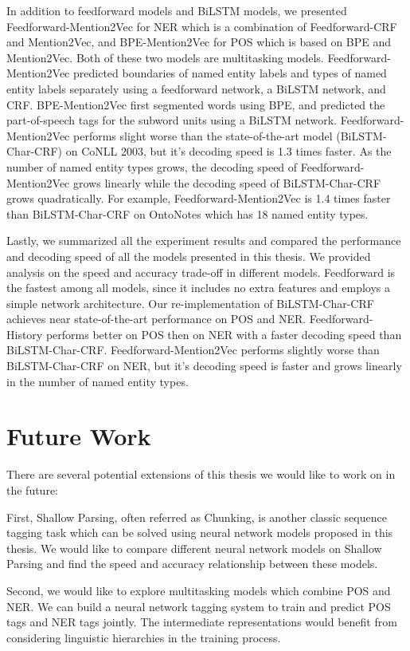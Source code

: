 \documentclass{sfuthesis}
\begin{document}
In addition to feedforward models and BiLSTM models, we presented Feedforward-Mention2Vec for NER which is a combination of Feedforward-CRF and Mention2Vec, and BPE-Mention2Vec for POS which is based on BPE and Mention2Vec. Both of these two models are multitasking models. Feedforward-Mention2Vec predicted boundaries of named entity labels and types of named entity labels separately using a feedforward network, a BiLSTM network, and CRF. BPE-Mention2Vec first segmented words using BPE, and predicted the part-of-speech tags for the subword units using a BiLSTM network. Feedforward-Mention2Vec performs slight worse than the state-of-the-art model (BiLSTM-Char-CRF) on CoNLL 2003, but it's decoding speed is 1.3 times faster. As the number of named entity types grows, the decoding speed of Feedforward-Mention2Vec grows linearly while the decoding speed of BiLSTM-Char-CRF grows quadratically. For example, Feedforward-Mention2Vec is 1.4 times faster than BiLSTM-Char-CRF on OntoNotes which has 18 named entity types.

Lastly, we summarized all the experiment results and compared the performance and decoding speed of all the models presented in this thesis. We provided analysis on the speed and accuracy trade-off in different models. Feedforward is the fastest among all models, since it includes no extra features and employs a simple network architecture. Our re-implementation of BiLSTM-Char-CRF achieves near state-of-the-art performance on POS and NER. Feedforward-History performs better on POS then on NER with a faster decoding speed than BiLSTM-Char-CRF. Feedforward-Mention2Vec performs slightly worse than BiLSTM-Char-CRF on NER, but it's decoding speed is faster and grows linearly in the number of named entity types.

\section{Future Work}
There are several potential extensions of this thesis we would like to work on in the future:

First, Shallow Parsing, often referred as Chunking, is another classic sequence tagging task which can be solved using neural network models proposed in this thesis. We would like to compare different neural network models on Shallow Parsing and find the speed and accuracy relationship between these models.

Second, we would like to explore multitasking models which combine POS and NER. We can build a neural network tagging system to train and predict POS tags and NER tags jointly. The intermediate representations would benefit from considering linguistic hierarchies in the training process.
\end{document}
